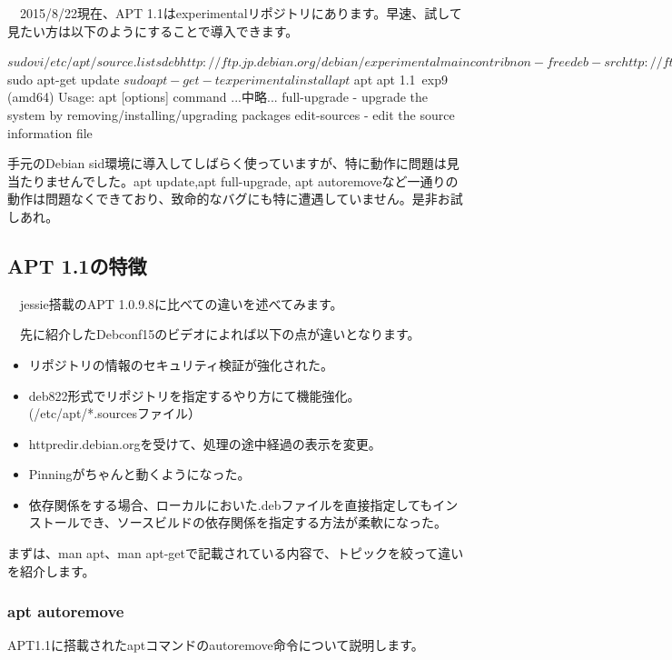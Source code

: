 \documentclass[mingoth,a4paper]{jsarticle}
\begin{document}
　2015/8/22現在、APT 1.1はexperimentalリポジトリにあります。早速、試して見たい方は以下のようにすることで導入できます。

\begin{commandline}
$ sudo vi /etc/apt/source.lists
deb http://ftp.jp.debian.org/debian/ experimental main contrib non-free
deb-src http://ftp.jp.debian.org/debian/ experimental main contrib non-free
$ sudo apt-get update
$ sudo apt-get -t experimental install apt
$ apt
apt 1.1~exp9 (amd64)
Usage: apt [options] command
...中略...
 full-upgrade - upgrade the system by removing/installing/upgrading packages
 edit-sources - edit the source information file
\end{commandline}

 手元のDebian sid環境に導入してしばらく使っていますが、特に動作に問題は見当たりませんでした。apt update,apt full-upgrade, apt autoremoveなど一通りの動作は問題なくできており、致命的なバグにも特に遭遇していません。是非お試しあれ。

\subsection{APT 1.1の特徴}

　jessie搭載のAPT 1.0.9.8に比べての違いを述べてみます。

　先に紹介したDebconf15のビデオによれば以下の点が違いとなります。

\begin{itemize}
\item リポジトリの情報のセキュリティ検証が強化された。
\item deb822形式でリポジトリを指定するやり方にて機能強化。(/etc/apt/*.sourcesファイル）
\item httpredir.debian.orgを受けて、処理の途中経過の表示を変更。
\item Pinningがちゃんと動くようになった。
\item 依存関係をする場合、ローカルにおいた.debファイルを直接指定してもインストールでき、ソースビルドの依存関係を指定する方法が柔軟になった。
\end{itemize}

 まずは、man apt、man apt-getで記載されている内容で、トピックを絞って違いを紹介します。

\subsubsection{apt autoremove}

 APT1.1に搭載されたaptコマンドのautoremove命令について説明します。
\end{document}

